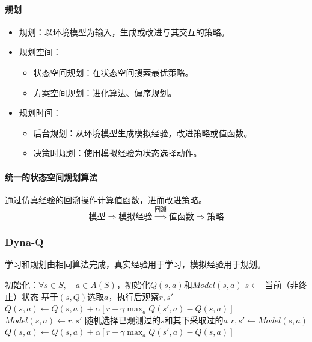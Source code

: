 \documentclass[
12pt, %
a4paper, 
oneside, %
]{scrartcl}
\begin{document}
{\paragraph{规划}
\begin{itemize}
\item 规划：以环境模型为输入，生成或改进与其交互的策略。
\item 规划空间：
\begin{itemize}
\item 状态空间规划：在状态空间搜索最优策略。
\item 方案空间规划：进化算法、偏序规划。
\end{itemize}
\item 规划时间：
\begin{itemize}
\item 后台规划：从环境模型生成模拟经验，改进策略或值函数。
\item 决策时规划：使用模拟经验为状态选择动作。
\end{itemize}
\end{itemize}
\paragraph{统一的状态空间规划算法}
通过仿真经验的回溯操作计算值函数，进而改进策略。
$$ \text{模型} \Longrightarrow \text{模拟经验} \overset{\text{回溯}}{\Longrightarrow} \text{值函数} \Longrightarrow \text{策略} $$
\subsubsection[Dyna-Q]{Dyna-Q}
学习和规划由相同算法完成，真实经验用于学习，模拟经验用于规划。
\begin{myalgorithm}[Dyna-Q]
\State 初始化：$ \forall s \in S, \quad a \in A(S) $，初始化$ Q(s, a) $和$ Model(s, a) $
\Loop
\State $ s \gets $ 当前（非终止）状态 
\State 基于$ (s, Q) $选取$ a $，执行后观察$ r,s' $ 
\State $ Q(s, a) \gets Q(s, a) + \alpha[r + \gamma \max_a Q(s', a) - Q(s, a)] $ 
\State $ Model(s, a) \gets r, s' $
 
\State 随机选择已观测过的$ s $和其下采取过的$ a $
\State $ r,s' \gets Model(s, a) $ 
\State $ Q(s, a) \gets Q(s, a) + \alpha[r + \gamma \max_a Q(s', a) - Q(s, a)] $ 
\EndFor
\EndLoop
\end{myalgorithm}
}
\end{document}
